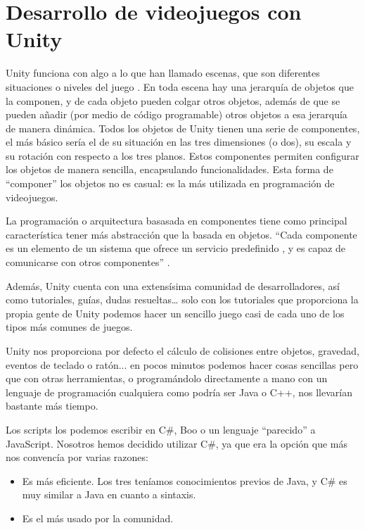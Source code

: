 \section{Desarrollo de videojuegos con Unity}
\label{cap4:sec:unity}

Unity funciona con algo a lo que han llamado escenas, que son diferentes situaciones o niveles del juego \cite{Unity3d}. En toda escena hay una jerarquía de objetos que la componen, y de cada objeto pueden colgar otros objetos, además de que se pueden añadir (por medio de código programable) otros objetos a esa jerarquía de manera dinámica. Todos los objetos de Unity tienen una serie de componentes, el más básico sería el de su situación en las tres dimensiones (o dos), su escala y su rotación con respecto a los tres planos. Estos componentes permiten configurar los objetos de manera sencilla, encapsulando funcionalidades. Esta forma de ``componer'' los objetos no es casual: es la más utilizada en programación de videojuegos.

La programación o arquitectura basasada en componentes tiene como principal característica tener más abstracción que la basada en objetos. ``Cada componente es un elemento de un sistema que ofrece un servicio predefinido , y es capaz de comunicarse con otros componentes'' \cite{progcomponentes}.

 Además, Unity cuenta con una extensísima comunidad de desarrolladores, así como tutoriales, guías, dudas resueltas\ldots{} solo con los tutoriales que proporciona la propia gente de Unity podemos hacer un sencillo juego casi de cada uno de los tipos más comunes de juegos.

Unity nos proporciona por defecto el cálculo de colisiones entre objetos, gravedad, eventos de teclado o ratón... en pocos minutos podemos hacer cosas sencillas pero que con otras herramientas, o programándolo directamente a mano con un lenguaje de programación cualquiera como podría ser Java o C++, nos llevarían bastante más tiempo.

Los scripts los podemos escribir en C#, Boo o un lenguaje ``parecido'' a JavaScript. Nosotros hemos decidido utilizar C\#, ya que era la opción que más nos convencía por varias razones:

\begin{itemize}
\item{Es más eficiente. Los tres teníamos conocimientos previos de Java, y C\# es muy similar a Java en cuanto a sintaxis.}
\item{Es el más usado por la comunidad.}
\end{itemize}

